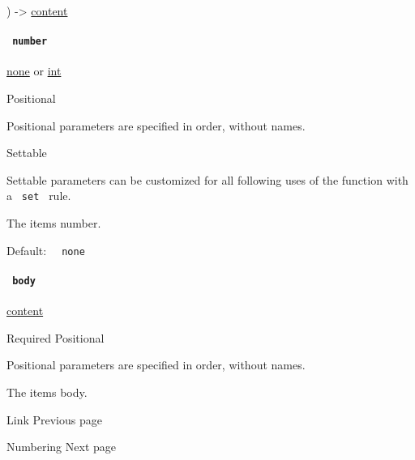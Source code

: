 ) -\textgreater{} \href{/docs/reference/foundations/content/}{content}

\paragraph{\texorpdfstring{\texttt{\ number\ }}{ number }}\label{definitions-item-number}

\href{/docs/reference/foundations/none/}{none} {or}
\href{/docs/reference/foundations/int/}{int}

{{ Positional }}

\label{definitions-item-number-positional-tooltip}
Positional parameters are specified in order, without names.

{{ Settable }}

\label{definitions-item-number-settable-tooltip}
Settable parameters can be customized for all following uses of the
function with a \texttt{\ set\ } rule.

The item\textquotesingle s number.

Default: \texttt{\ }{\texttt{\ none\ }}\texttt{\ }

\paragraph{\texorpdfstring{\texttt{\ body\ }}{ body }}\label{definitions-item-body}

\href{/docs/reference/foundations/content/}{content}

{Required} {{ Positional }}

\label{definitions-item-body-positional-tooltip}
Positional parameters are specified in order, without names.

The item\textquotesingle s body.

\href{/docs/reference/model/link/}{\pandocbounded{}}

{ Link } { Previous page }

\href{/docs/reference/model/numbering/}{\pandocbounded{}}

{ Numbering } { Next page }
